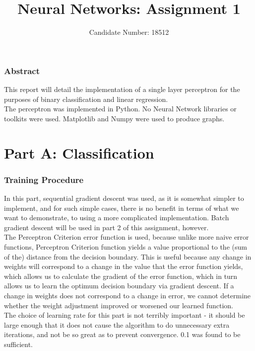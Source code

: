 \documentclass{article}
\title{Neural Networks: Assignment 1}
\author{Candidate Number: 18512}
\begin{document}
\maketitle

\begin{centering}
\subsubsection*{Abstract}
\end{centering}
\noindent This report will detail the implementation of a single layer perceptron for the purposes of binary classification and linear regression. \\
\indent The perceptron was implemented in Python. No Neural Network libraries or toolkits were used. Matplotlib and Numpy were used to produce graphs.
\vspace{4mm}

\section*{Part A: Classification}
\subsubsection*{Training Procedure}
In this part, sequential gradient descent was used, as it is somewhat simpler to implement, and for such simple cases, there is no benefit in terms of what we want to demonstrate, to using a more complicated implementation. Batch gradient descent will be used in part 2 of this assignment, however. \\
\indent The Perceptron Criterion error function is used, because unlike more naive error functions, Perceptron Criterion function yields a value proportional to the (sum of the) distance from the decision boundary. This is useful because any change in weights will correspond to a change in the value that the error function yields, which allows us to calculate the gradient of the error function, which in turn allows us to learn the optimum decision boundary via gradient descent. If a change in weights does not correspond to a change in error, we cannot determine whether the weight adjustment improved or worsened our learned function. \\
\indent The choice of learning rate for this part is not terribly important - it should be large enough that it does not cause the algorithm to do unnecessary extra iterations, and not be so great as to prevent convergence. 0.1 was found to be sufficient. \\
\end{document}
